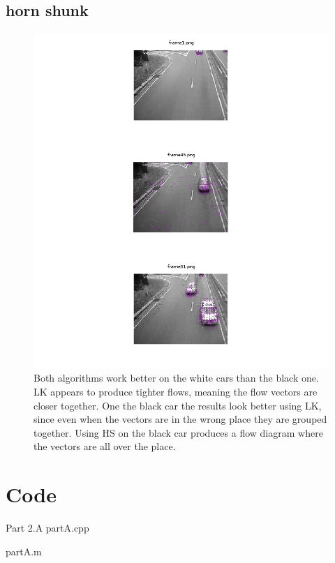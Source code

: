 \documentclass{article}
\begin{document}
	\subsection{horn shunk}
	\begin{figure}[H]
		\includegraphics[width=\linewidth]{Q4/partB/partB.png}
	Both algorithms work better on the white cars than the black one. LK appears to produce tighter flows, meaning the flow vectors are closer together. One the black car the results look better using LK, since even when the vectors are in the wrong place they are grouped together. Using HS on the black car produces a flow diagram where the vectors are all over the place.
		
	\end{figure}
	
	\newpage
	\section{Code}
	
	Part 2.A
	partA.cpp
	
	\newpage
	
	partA.m
	
	\newpage
	
\end{document}
